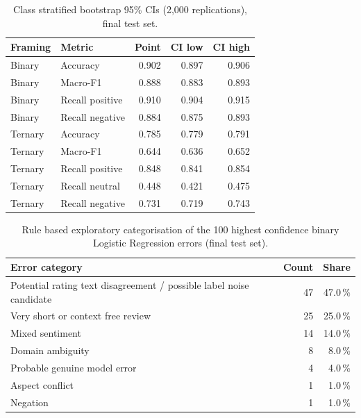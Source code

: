 \documentclass[11pt,a4paper,DIV=12]{scrartcl}
\begin{document}
\begin{table}[H]
\centering
\caption{Class stratified bootstrap 95\% CIs (2,000 replications), final test set.}
\label{tab:rq1bootstrap}
\begin{tabular}{llrrr}
\toprule
Framing & Metric & Point & CI low & CI high \\
\midrule
Binary  & Accuracy          & 0.902 & 0.897 & 0.906 \\
Binary  & Macro-F1          & 0.888 & 0.883 & 0.893 \\
Binary  & Recall positive   & 0.910 & 0.904 & 0.915 \\
Binary  & Recall negative   & 0.884 & 0.875 & 0.893 \\
\midrule
Ternary & Accuracy          & 0.785 & 0.779 & 0.791 \\
Ternary & Macro-F1          & 0.644 & 0.636 & 0.652 \\
Ternary & Recall positive   & 0.848 & 0.841 & 0.854 \\
Ternary & Recall neutral    & 0.448 & 0.421 & 0.475 \\
Ternary & Recall negative   & 0.731 & 0.719 & 0.743 \\
\bottomrule
\end{tabular}
\end{table}

\begin{table}[H]
\centering
\caption{Rule based exploratory categorisation of the 100 highest confidence binary Logistic Regression errors (final test set).}
\label{tab:err}
\begin{tabular}{lrr}
\toprule
Error category & Count & Share \\
\midrule
Potential rating text disagreement / possible label noise candidate & 47 & 47.0\,\% \\
Very short or context free review                & 25 & 25.0\,\% \\
Mixed sentiment                                  & 14 & 14.0\,\% \\
Domain ambiguity                                 & 8  & 8.0\,\% \\
Probable genuine model error                     & 4  & 4.0\,\% \\
Aspect conflict                                  & 1  & 1.0\,\% \\
Negation                                         & 1  & 1.0\,\% \\
\bottomrule
\end{tabular}
\end{table}
\end{document}

